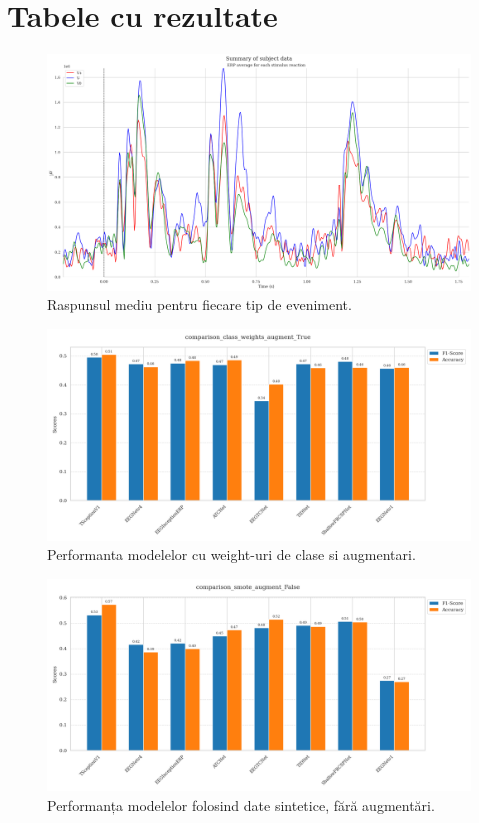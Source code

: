 \chapter{Tabele cu rezultate}

\begin{figure}
    \centering
    \includegraphics[width=1\linewidth]{images/average_response_each_erp.png}
    \caption{Raspunsul mediu pentru fiecare tip de eveniment.}
    \label{fig:average_response_by_event}
\end{figure}

\begin{figure}[h]
    \centering
    \includegraphics[width=1\linewidth]{images/comparison_class_weights_augment_True.png}
    \caption{Performanta modelelor cu weight-uri de clase si augmentari.}
    \label{fig:performance_class_weights_augment_true}
\end{figure}

\begin{figure}
    \centering
    \includegraphics[width=1\linewidth]{images/comparison_smote_augment_False.png}
    \caption{Performanța modelelor folosind date sintetice, fără augmentări.}
    \label{fig:smote_augment_false}
\end{figure}

